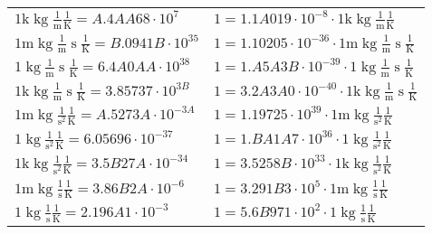 \begin{center}
\begin{longtable}{l l}
{\color{gray}$1 \bm{\mathrm{ k}}\operatorname{kg}\frac1{\operatorname{m}}{}{}\frac1{\operatorname{K}} = A.4AA68\cdot10^{7} $}   & {\color{gray}$ 1 = 1.1A019\cdot10^{-8} \cdot 1 \bm{\mathrm{ k}}\operatorname{kg}\frac1{\operatorname{m}}{}{}\frac1{\operatorname{K}}$}  \\
{\color{gray}$1 \bm{\mathrm{ m}}\operatorname{kg}\frac1{\operatorname{m}}{\operatorname{s}}{}\frac1{\operatorname{K}} = B.0941B\cdot10^{35} $}   & {\color{gray}$ 1 = 1.10205\cdot10^{-36} \cdot 1 \bm{\mathrm{ m}}\operatorname{kg}\frac1{\operatorname{m}}{\operatorname{s}}{}\frac1{\operatorname{K}}$}  \\
{\color{black}$1 \bm{\mathrm{ }}\operatorname{kg}\frac1{\operatorname{m}}{\operatorname{s}}{}\frac1{\operatorname{K}} = 6.4A0AA\cdot10^{38} $}   & {\color{black}$ 1 = 1.A5A3B\cdot10^{-39} \cdot 1 \bm{\mathrm{ }}\operatorname{kg}\frac1{\operatorname{m}}{\operatorname{s}}{}\frac1{\operatorname{K}}$}  \\
{\color{gray}$1 \bm{\mathrm{ k}}\operatorname{kg}\frac1{\operatorname{m}}{\operatorname{s}}{}\frac1{\operatorname{K}} = 3.85737\cdot10^{3B} $}   & {\color{gray}$ 1 = 3.2A3A0\cdot10^{-40} \cdot 1 \bm{\mathrm{ k}}\operatorname{kg}\frac1{\operatorname{m}}{\operatorname{s}}{}\frac1{\operatorname{K}}$}  \\
{\color{gray}$1 \bm{\mathrm{ m}}\operatorname{kg}{}\frac1{\operatorname{s}^2}{}\frac1{\operatorname{K}} = A.5273A\cdot10^{-3A} $}   & {\color{gray}$ 1 = 1.19725\cdot10^{39} \cdot 1 \bm{\mathrm{ m}}\operatorname{kg}{}\frac1{\operatorname{s}^2}{}\frac1{\operatorname{K}}$}  \\
{\color{black}$1 \bm{\mathrm{ }}\operatorname{kg}{}\frac1{\operatorname{s}^2}{}\frac1{\operatorname{K}} = 6.05696\cdot10^{-37} $}   & {\color{black}$ 1 = 1.BA1A7\cdot10^{36} \cdot 1 \bm{\mathrm{ }}\operatorname{kg}{}\frac1{\operatorname{s}^2}{}\frac1{\operatorname{K}}$}  \\
{\color{gray}$1 \bm{\mathrm{ k}}\operatorname{kg}{}\frac1{\operatorname{s}^2}{}\frac1{\operatorname{K}} = 3.5B27A\cdot10^{-34} $}   & {\color{gray}$ 1 = 3.5258B\cdot10^{33} \cdot 1 \bm{\mathrm{ k}}\operatorname{kg}{}\frac1{\operatorname{s}^2}{}\frac1{\operatorname{K}}$}  \\
{\color{gray}$1 \bm{\mathrm{ m}}\operatorname{kg}{}\frac1{\operatorname{s}}{}\frac1{\operatorname{K}} = 3.86B2A\cdot10^{-6} $}   & {\color{gray}$ 1 = 3.291B3\cdot10^{5} \cdot 1 \bm{\mathrm{ m}}\operatorname{kg}{}\frac1{\operatorname{s}}{}\frac1{\operatorname{K}}$}  \\
{\color{black}$1 \bm{\mathrm{ }}\operatorname{kg}{}\frac1{\operatorname{s}}{}\frac1{\operatorname{K}} = 2.196A1\cdot10^{-3} $}   & {\color{black}$ 1 = 5.6B971\cdot10^{2} \cdot 1 \bm{\mathrm{ }}\operatorname{kg}{}\frac1{\operatorname{s}}{}\frac1{\operatorname{K}}$}  \\

\end{longtable}
\end{center}
